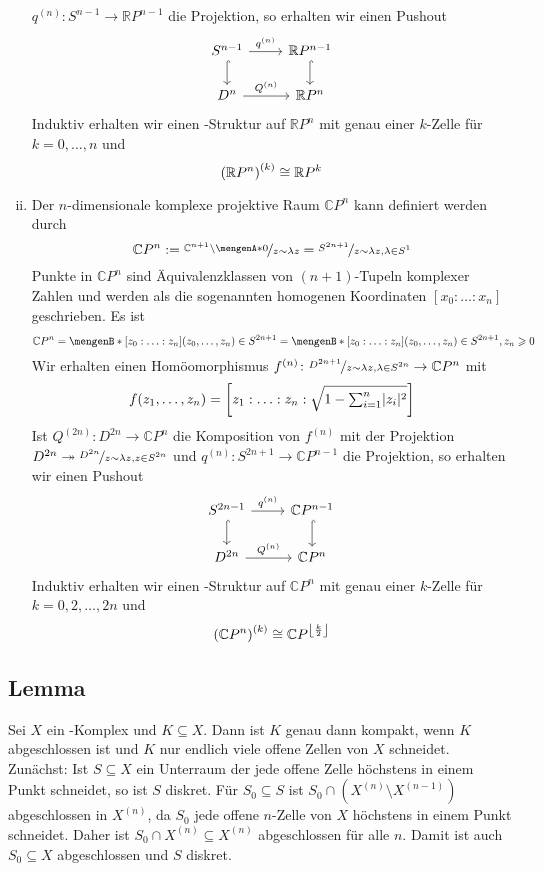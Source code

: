 \begin{enumerate}[(i)]
	$q^{(n)} \colon S^{n-1} \to \mathds{R}P^{n-1}$ die Projektion, so erhalten wir einen Pushout
	\[
		\begin{tikzcd}
			S^{n-1} \rar["q^{(n)}"] \dar[hook]& \mathds{R}P^{n-1} \dar[hook] \\
			D^n \rar["Q^{(n)}"] & \mathds{R}P^n
		\end{tikzcd}
	\]
	Induktiv erhalten wir einen \CW-Struktur auf $\mathds{R}P^n$ mit genau einer $k$-Zelle für $k=0,\ldots ,n$ und 
	\[
		\enbrace*{\mathds{R}P^n}^{(k)} \cong \mathds{R}P^k 
	\]
	\item Der $n$-dimensionale komplexe projektive Raum $\mathds{C}P^n$ kann definiert werden durch 
	\[
		\mathds{C}P^n := \nicefrac{\mathds{C}^{n+1} \setminus \set{0}}{z \sim \lambda z} = \nicefrac{S^{2n+1}}{z \sim \lambda z, \lambda \in S^1}
	\]
	Punkte in $\mathds{C}P^n$ sind Äquivalenzklassen von $(n+1)$-Tupeln komplexer Zahlen und werden als die sogenannten homogenen Koordinaten $[x_0 : \ldots : x_n]$ 
	geschrieben. Es ist 
	\[
		\mathds{C}P^n = \set[{[z_0 : \ldots : z_n]}]{(z_0, \ldots ,z_n) \in S^{2n+1} \rule{0cm}{1em}} 
		= \set[{[z_0 : \ldots : z_n]}]{(z_0, \ldots ,z_n) \in S^{2n+1}, z_n \ge 0 \rule{0cm}{1em}}
	\]
	Wir erhalten einen Homöomorphismus $f^{(n)} \colon \nicefrac{D^{2n+1}}{z \sim \lambda z, \lambda \in S^{2n}} \to \mathds{C}P^n$ mit
	\[
		f \enbrace*{z_1, \ldots ,z_n} = \benbrace*{z_1 : \ldots : z_n : \sqrt{1- {\textstyle\sum\nolimits_{i=1}^{n}} \abs{z_i}^2}} 
	\]
	Ist $Q^{(2n)} : D^{2n} \to \mathds{C}P^n$ die Komposition von $f^{(n)}$ mit der Projektion $D^{2n} \twoheadrightarrow \nicefrac{D^{2n}}{z \sim \lambda z, z \in S^{2n}}$ und 
	$q^{(n)} \colon S^{2n+1} \to \mathds{C}P^{n-1}$ die Projektion, so erhalten wir einen Pushout
	\[
		\begin{tikzcd}
			S^{2n-1} \rar["q^{(n)}"] \dar[hook]& \mathds{C}P^{n-1} \dar[hook] \\
			D^{2n} \rar["Q^{(n)}"] & \mathds{C}P^n
		\end{tikzcd}
	\]
	Induktiv erhalten wir einen \CW-Struktur auf $\mathds{C}P^n$ mit genau einer $k$-Zelle für $k=0,2,\ldots ,2n$ und 
	\[
		\enbrace*{\mathds{C}P^n}^{(k)} \cong \mathds{C}P^{\floor*{\frac{k}{2}}} 
	\]
\end{enumerate}

\subsection[Lemma: Kompaktheit von Teilmengen eines \CW-Komplexes]{Lemma} %
\label{sub:115}
Sei $X$ ein \CW-Komplex und $K \subseteq X$. Dann ist $K$ genau dann kompakt, wenn $K$ abgeschlossen ist und $K$ nur endlich viele offene Zellen von $X$ schneidet.
Zunächst: Ist $S \subseteq X$ ein Unterraum der jede offene Zelle höchstens in einem Punkt schneidet, so ist $S$ diskret. Für $S_0 \subseteq S$ ist 
$S_0 \cap (X^{(n)} \setminus X^{(n-1)})$ abgeschlossen in $X^{(n)}$, da $S_0$ jede offene $n$-Zelle von $X$ höchstens in einem Punkt schneidet.  Daher ist 
$S_0 \cap X^{(n)} \subseteq X^{(n)}$ abgeschlossen für alle $n$. Damit ist auch $S_0 \subseteq X$ abgeschlossen und $S$ diskret.


